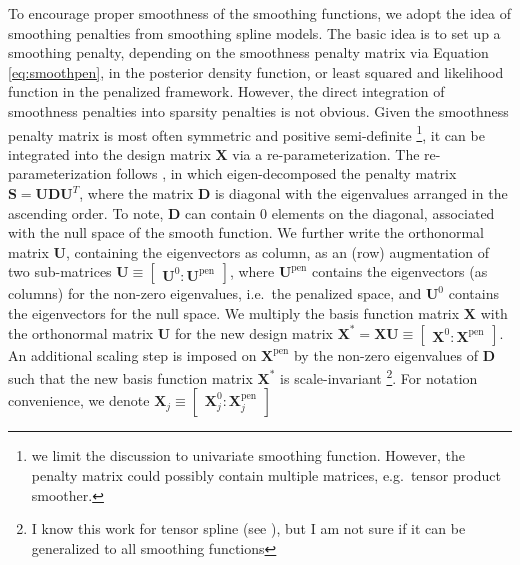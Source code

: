 \documentclass[AMA,STIX1COL,]{WileyNJD-v2}
\begin{document}
To encourage proper smoothness of the smoothing functions, we adopt the
idea of smoothing penalties from smoothing spline models. The basic idea
is to set up a smoothing penalty, depending on the smoothness penalty
matrix via Equation \ref{eq:smoothpen}, in the posterior density
function, or least squared and likelihood function in the penalized
framework. However, the direct integration of smoothness penalties into
sparsity penalties is not obvious. Given the smoothness penalty matrix
is most often symmetric and positive semi-definite \footnote{ we limit
  the discussion to univariate smoothing function. However, the penalty
  matrix could possibly contain multiple matrices, e.g.~tensor product
  smoother.}, it can be integrated into the design matrix
\(\boldsymbol{X}\) via a re-parameterization. The re-parameterization
follows \citet{Marra2011}, in which eigen-decomposed the penalty matrix
\(\boldsymbol{S} = \boldsymbol{U} \boldsymbol{D} \boldsymbol{U}^T\),
where the matrix \(\boldsymbol{D}\) is diagonal with the eigenvalues
arranged in the ascending order. To note, \(\boldsymbol{D}\) can contain
\(0\) elements on the diagonal, associated with the null space of the
smooth function. We further write the orthonormal matrix
\(\boldsymbol{U}\), containing the eigenvectors as column, as an (row)
augmentation of two sub-matrices
\(\boldsymbol{U} \equiv \begin{bmatrix}\boldsymbol{U}^0 : \boldsymbol{U}^{\text{pen}}\end{bmatrix}\),
where \(\boldsymbol{U}^{\text{pen}}\) contains the eigenvectors (as
columns) for the non-zero eigenvalues, i.e.~the penalized space, and
\(\boldsymbol{U}^0\) contains the eigenvectors for the null space. We
multiply the basis function matrix \(\boldsymbol{X}\) with the
orthonormal matrix \(\boldsymbol{U}\) for the new design matrix
\(\boldsymbol{X}^\ast = \boldsymbol{X} \boldsymbol{U} \equiv \begin{bmatrix} \boldsymbol{X}^0 : \boldsymbol{X}^{\text{pen}} \end{bmatrix}\).
An additional scaling step is imposed on \(\boldsymbol{X}^{\text{pen}}\)
by the non-zero eigenvalues of \(\boldsymbol{D}\) such that the new
basis function matrix \(\boldsymbol{X}^\ast\) is scale-invariant
\footnote{ I know this work for tensor spline (see \citet{Wood2006}),
  but I am not sure if it can be generalized to all smoothing functions}.
For notation convenience, we denote
\(\boldsymbol{X}_j \equiv \begin{bmatrix} \boldsymbol{X}_j^0 : \boldsymbol{X}_j^{\text{pen}} \end{bmatrix}\)
\end{document}
